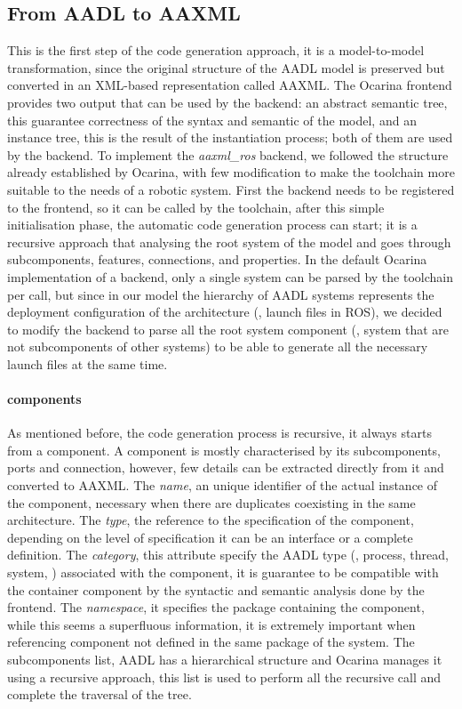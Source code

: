 \subsection{From AADL to AAXML}
This is the first step of the code generation approach, it is a model-to-model transformation, since the original structure of the AADL model is preserved but converted in an XML-based representation called AAXML. The Ocarina frontend provides two output that can be used by the backend: an abstract semantic tree, this guarantee correctness of the syntax and semantic of the model, and an instance tree, this is the result of the instantiation process; both of them are used by the backend. To implement the \textit{aaxml\_ros} backend, we followed the structure already established by Ocarina, with few modification to make the toolchain more suitable to the needs of a robotic system. First the backend needs to be registered to the frontend, so it can be called by the toolchain, after this simple initialisation phase, the automatic code generation process can start; it is a recursive approach that  analysing the root system of the model and goes through subcomponents, features, connections, and properties. In the default Ocarina implementation of a backend, only a single system can be parsed by the toolchain per call, but since in our model the hierarchy of AADL systems represents the deployment configuration of the architecture (\ie, launch files in ROS), we decided to modify the backend to parse all the root system component (\ie, system that are not subcomponents of other systems) to be able to generate all the necessary launch files at the same time.

\paragraph{components} As mentioned before, the code generation process is recursive, it always starts from a component. A component is mostly characterised by its subcomponents, ports and connection, however, few details can be extracted directly from it and converted to AAXML. The \textit{name}, an unique identifier of the actual instance of the component, necessary when there are duplicates coexisting in the same architecture. The \textit{type}, the reference to the specification of the component, depending on the level of specification it can be an interface or a complete definition. The \textit{category}, this attribute specify the AADL type (\eg, process, thread, system, \etc) associated with the component, it is guarantee to be compatible with the container component by the syntactic and semantic analysis done by the frontend. The \textit{namespace}, it specifies the package containing the component, while this seems a superfluous information, it is extremely important when referencing component not defined in the same package of the system. The subcomponents list, AADL has a hierarchical structure and Ocarina manages it using a recursive approach, this list is used to perform all the recursive call and complete the traversal of the tree.

